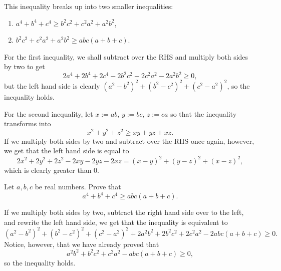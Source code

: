 \documentclass[a4paper, 12pt]{article}
\begin{document}
\begin{solution}
    This inequality breaks up into two smaller inequalities:
    \begin{enumerate}
        \item \( a^4 + b^4 + c^4 \ge b^2 c^2 + c^2 a^2 + a^2 b^2 \),
        \item \( b^2 c^2 + c^2 a^2 + a^2 b^2 \ge abc(a + b + c) \).
    \end{enumerate}
    For the first inequality, we shall subtract over the RHS and multiply both sides by two to get
    \[
        2a^4 + 2b^4 + 2c^4 - 2b^2 c^2 - 2 c^2 a^2 - 2a^2 b^2 \ge 0
    ,\]
    but the left hand side is clearly \( (a^2 - b^2)^2 + (b^2 - c^2)^2 + (c^2 - a^2)^2 \), so the inequality holds.

    For the second inequality, let \( x := ab \), \( y := bc \), \( z := ca \) so that the inequality transforms into
    \[
        x^2 + y^2 + z^2 \ge xy + yz + xz
    .\]
    If we multiply both sides by two and subtract over the RHS once again, however, we get that the left hand side is equal to
    \[
        2x^2 + 2y^2 + 2z^2 - 2xy - 2yz - 2xz = (x - y)^2 + (y-z)^2 + (x - z)^2
    ,\]
    which is clearly greater than \( 0 \).
\end{solution}

\begin{sidebox}
\begin{problem}
    Let \( a, b, c \) be real numbers. Prove that
    \[
        a^4 + b^4 + c^4 \ge abc(a + b + c)
    .\]
\end{problem}
\end{sidebox}

\begin{solution}
    If we multiply both sides by two, subtract the right hand side over to the left, and rewrite the left hand side, we get that the inequality is equivalent to
    \[
        (a^2 - b^2)^2 + (b^2 - c^2)^2 + (c^2 - a^2)^2 + 2a^2 b^2 + 2 b^2 c^2 + 2 c^2 a^2 - 2abc(a + b + c) \ge 0
    .\]
    Notice, however, that we have already proved that
    \[
        a^2 b^2 + b^2 c^2 + c^2 a^2 - abc(a + b + c) \ge 0
    ,\]
    so the inequality holds.
\end{solution}
\end{document}
